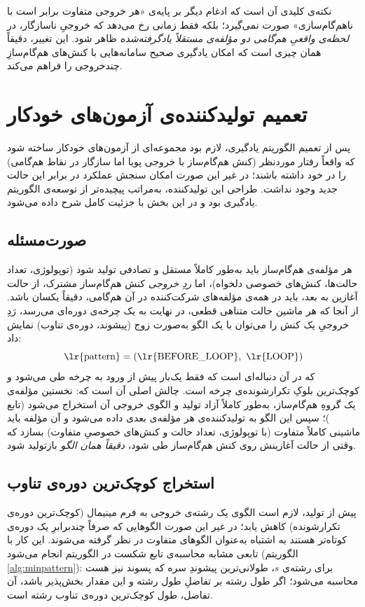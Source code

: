 \documentclass[a4paper,12pt]{article}
\numberwithin{algorithm}{section}
\begin{document}
نکته‌ی کلیدی آن است که ادغام دیگر بر پایه‌ی «هر خروجی متفاوت برابر است با ناهم‌گام‌سازی» صورت نمی‌گیرد؛ بلکه فقط زمانی رخ می‌دهد که خروجیِ ناسازگار، در \emph{لحظه‌ی واقعیِ هم‌گامی دو مؤلفه‌ی مستقلاً یادگرفته‌شده} ظاهر شود. این تغییر، دقیقاً همان چیزی است که امکان یادگیری صحیح سامانه‌هایی با کنش‌های هم‌گام‌سازِ چندخروجی را فراهم می‌کند.

\section{تعمیم تولیدکننده‌ی آزمون‌های خودکار}\label{sec:generator}
پس از تعمیم الگوریتم یادگیری، لازم بود مجموعه‌ای از آزمون‌های خودکار ساخته شود که واقعاً رفتار موردنظر (کنش هم‌گام‌ساز با خروجی پویا اما سازگار در نقاط هم‌گامی) را در خود داشته باشند؛ در غیر این صورت امکان سنجش عملکرد  در برابر این حالت جدید وجود نداشت. طراحی این تولیدکننده، به‌مراتب پیچیده‌تر از توسعه‌ی الگوریتم یادگیری بود و در این بخش با جزئیت کامل شرح داده می‌شود.

\subsection{صورت‌مسئله}
هر مؤلفه‌ی هم‌گام‌ساز باید به‌طور کاملاً مستقل و تصادفی تولید شود (توپولوژی، تعداد حالت‌ها، کنش‌های خصوصی دلخواه)، اما \emph{ردِ خروجی} کنش هم‌گام‌ساز مشترک، از حالت آغازین به بعد، باید در همه‌ی مؤلفه‌های شرکت‌کننده در آن هم‌گامی، دقیقاً یکسان باشد. از آنجا که هر ماشین حالت متناهی قطعی، در نهایت به یک چرخه‌ی دوره‌ای می‌رسد، رَدِ خروجیِ یک کنش را می‌توان با یک الگو به‌صورت زوج (پیشوند، دوره‌ی تناوب) نمایش داد:
\[
\text{\lr{pattern}} = (\text{\lr{BEFORE\_LOOP}},\ \text{\lr{LOOP}})
\]
که در آن  دنباله‌ای است که فقط یک‌بار پیش از ورود به چرخه طی می‌شود و  کوچک‌ترین بلوکِ تکرارشونده‌ی چرخه است. چالش اصلی آن است که: نخستین مؤلفه‌ی یک گروهِ هم‌گام‌ساز، به‌طور کاملاً آزاد تولید و الگوی خروجی آن استخراج می‌شود (تابع )؛ سپس این الگو به تولیدکننده‌ی هر مؤلفه‌ی بعدی داده می‌شود و آن مؤلفه باید ماشینی کاملاً متفاوت (با توپولوژی، تعداد حالت و کنش‌های خصوصیِ متفاوت) بسازد که وقتی از حالت آغازینش روی کنش هم‌گام‌ساز طی شود، \emph{دقیقاً همان الگو} بازتولید شود.

\subsection{استخراج کوچک‌ترین دوره‌ی تناوب}
پیش از تولید، لازم است الگوی یک رشته‌ی خروجی به فرم مینیمال (کوچک‌ترین دوره‌ی تکرارشونده) کاهش یابد؛ در غیر این صورت الگوهایی که صرفاً چندبرابرِ یک دوره‌ی کوتاه‌تر هستند به اشتباه به‌عنوان الگوهای متفاوت در نظر گرفته می‌شوند. این کار با تابعی مشابه محاسبه‌ی تابع شکست در الگوریتم  انجام می‌شود (الگوریتم \ref{alg:minpattern}): برای رشته‌ی $s$، طولانی‌ترین پیشوندِ سره که پسوند نیز هست محاسبه می‌شود؛ اگر طول رشته بر تفاضلِ طول رشته و این مقدار بخش‌پذیر باشد، آن تفاضل، طول کوچک‌ترین دوره‌ی تناوب رشته است.
\end{document}
